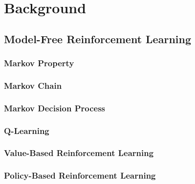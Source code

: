\chapter{Background}





\section{Model-Free Reinforcement Learning}




\subsection{Markov Property}




\subsection{Markov Chain}

\cite{sutton_reinforcement_2018}




\subsection{Markov Decision Process}




\subsection{Q-Learning}




\subsection{Value-Based Reinforcement Learning}




\subsection{Policy-Based Reinforcement Learning}

















